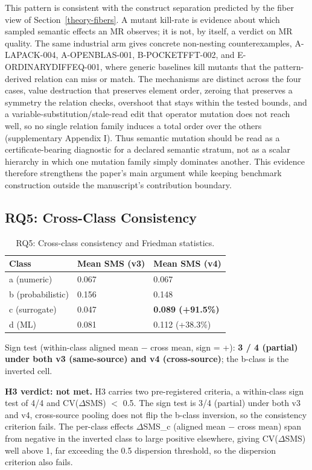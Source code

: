 \documentclass[manuscript,screen,review]{acmart}
\begin{document}
This pattern is consistent with the construct separation predicted by the
fiber view of Section~\ref{theory-fibers}. A mutant kill-rate is evidence about which sampled
semantic effects an MR observes; it is not, by itself, a verdict on MR
quality. The same industrial arm gives concrete non-nesting
counterexamples, A-LAPACK-004, A-OPENBLAS-001, B-POCKETFFT-002, and
E-ORDINARYDIFFEQ-001, where generic baselines kill mutants that the
pattern-derived relation can miss or match. The mechanisms are
distinct across the four cases, value destruction that preserves
element order, zeroing that preserves a symmetry the relation checks,
overshoot that stays within the tested bounds, and a
variable-substitution/stale-read edit that operator mutation does not
reach well, so no single relation family induces a total order over
the others (supplementary Appendix I).
Thus semantic mutation should be read as a certificate-bearing diagnostic
for a declared semantic stratum, not as a scalar hierarchy in which one
mutation family simply dominates another. This evidence therefore
strengthens the paper's main argument while keeping benchmark construction
outside the manuscript's contribution boundary.

\subsection{RQ5: Cross-Class Consistency}\label{rq3-cross-class-consistency-and-friedman}

{%
\begin{longtable}[]{@{}lll@{}}
\caption{RQ5: Cross-class consistency and Friedman statistics.}\label{tab:p2-12}\\
\toprule\noalign{}
Class & Mean SMS (v3) & Mean SMS (v4) \\
\midrule\noalign{}
\endfirsthead
\endhead
\bottomrule\noalign{}
\endlastfoot
a (numeric) & 0.067 & 0.067 \\
b (probabilistic) & 0.156 & 0.148 \\
c (surrogate) & 0.047 & \textbf{0.089 (+91.5\%)} \\
d (ML) & 0.081 & 0.112 (+38.3\%) \\
\end{longtable}
}

Sign test (within-class aligned mean $-$ cross mean, sign = +): \textbf{3
/ 4 (partial) under both v3 (same-source) and v4 (cross-source)}; the
b-class is the inverted cell.

\textbf{H3 verdict: not met.} H3 carries two pre-registered criteria, a
within-class sign test of 4/4 and CV($\Delta$SMS) $<$ 0.5. The sign test
is 3/4 (partial) under both v3 and v4, cross-source pooling does not
flip the b-class inversion, so the consistency criterion fails. The
per-class effects $\Delta$SMS\_c (aligned mean $-$ cross mean) span from
negative in the inverted class to large positive elsewhere, giving
CV($\Delta$SMS) well above 1, far exceeding the 0.5 dispersion threshold,
so the dispersion criterion also fails.
\end{document}
